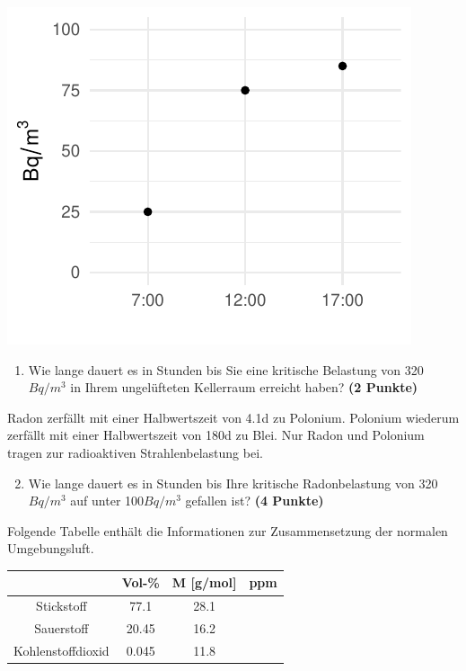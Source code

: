 \documentclass[a4paper, 9pt]{scrartcl}\usepackage[]{graphicx}\usepackage[]{xcolor}
\makeatletter
\def\maxwidth{ %
  \ifdim\Gin@nat@width>\linewidth
    \linewidth
  \else
    \Gin@nat@width
  \fi
}
\newenvironment{knitrout}{}{} %
\makeatother
\begin{document}
\begin{knitrout}
\color{fgcolor}

{\centering \includegraphics[width=\maxwidth]{img/math-10-1} 

}


\end{knitrout}

\vspace{-0.75cm}

\begin{enumerate}
\item Wie lange dauert es in Stunden bis Sie eine kritische Belastung von 320$Bq/m^3$ in Ihrem ungelüfteten Kellerraum erreicht haben? \textbf{(2 Punkte)}
\end{enumerate}

Radon zerfällt mit einer Halbwertszeit von 4.1d zu Polonium. Polonium wiederum zerfällt mit einer Halbwertszeit von 180d zu Blei. Nur Radon und Polonium tragen zur radioaktiven Strahlenbelastung bei.

\begin{enumerate}
  \setcounter{enumi}{1}
\item Wie lange dauert es in Stunden bis Ihre kritische Radonbelastung von
  320$Bq/m^3$ auf unter 100$Bq/m^3$ gefallen ist?
  \textbf{(4 Punkte)}
\end{enumerate}

Folgende Tabelle enthält die Informationen zur Zusammensetzung der normalen Umgebungsluft.

\begin{center}
  \begin{tabular}{ c|c|c|c }
     & Vol-\% & M [g/mol] & ppm \\
    \hline
    Stickstoff & 77.1 & 28.1 &
                                                    \phantom{1000000000000}\strut\\
        \hline
    Sauerstoff & 20.45 & 16.2 &
                                                    \phantom{10000000}\strut\\
        \hline
    Kohlenstoffdioxid & 0.045 & 11.8 & \phantom{10000000}\strut\\     
     \hline
\end{tabular}
\end{center}
\end{document}
